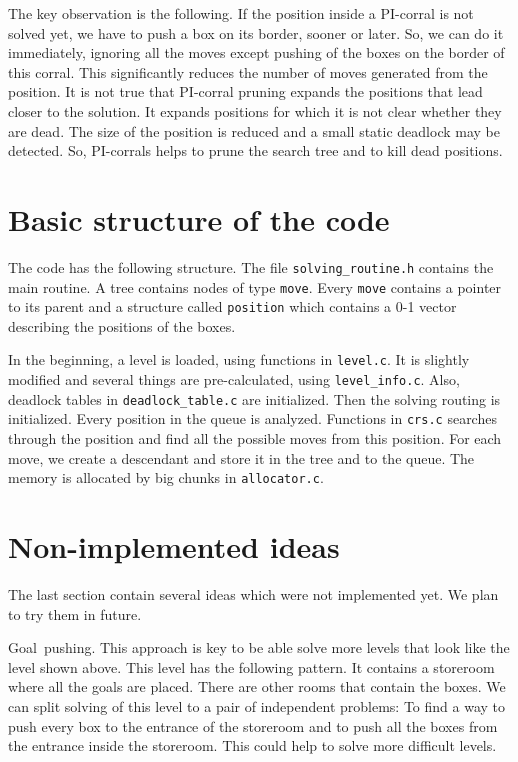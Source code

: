 \documentclass[twocolumn]{article}
\newcommand{\heading}[1]{\smallbreak\par\noindent\hbox{\mybf #1}}
\begin{document}
The key observation is the following. If the position inside a PI-corral is not solved yet, we have to push a box on its border, sooner or later.
So, we can do it immediately, ignoring all the moves except pushing of the boxes on the border of this corral. This significantly reduces the number
of moves generated from the position. It is not true that PI-corral pruning expands the positions that lead closer to the solution.  It expands
positions for which it is not clear whether they are dead. The size of the position is reduced and a small static deadlock may be detected. So,
PI-corrals helps to prune the search tree and to kill dead positions.

\section{Basic structure of the code}

The code has the following structure. The file \verb|solving_routine.h| contains the main routine. A tree contains nodes of type {\tt move}. Every
{\tt move} contains a pointer to its parent and a structure called {\tt position} which contains a 0-1 vector describing the positions of the boxes.

In the beginning, a level is loaded, using functions in {\tt level.c}. It is slightly modified and several things are pre-calculated, using
\verb|level_info.c|. Also, deadlock tables in \verb|deadlock_table.c| are initialized. Then the solving routing is initialized. Every position in the
queue is analyzed. Functions in {\tt crs.c} searches through the position and find all the possible moves from this position. For each move, we create
a descendant and store it in the tree and to the queue. The memory is allocated by big chunks in {\tt allocator.c}.

\section{Non-implemented ideas}

The last section contain several ideas which were not implemented yet. We plan to try them in future. 

\heading{Goal pushing.} This approach is key to be able solve more levels that look like the level shown above. This level has the following pattern.
It contains a storeroom where all the goals are placed. There are other rooms that contain the boxes. We can split solving of this level to a pair of
independent problems: To find a way to push every box to the entrance of the storeroom and to push all the boxes from the entrance inside the
storeroom. This could help to solve more difficult levels.
\end{document}
